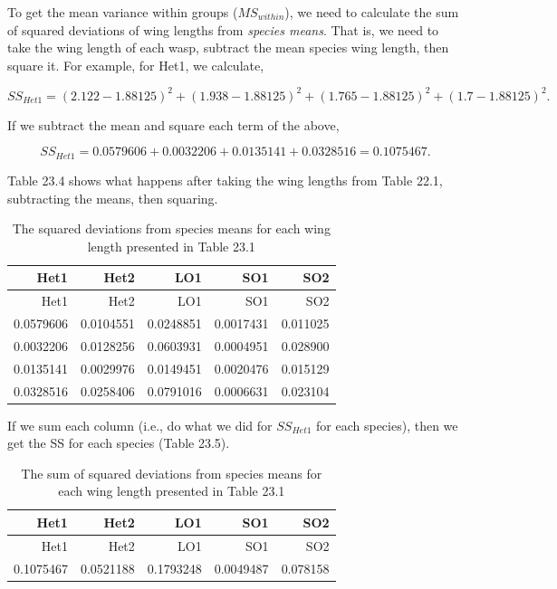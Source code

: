 \documentclass[
]{scrbook}
\begin{document}
To get the mean variance within groups (\(MS_{within}\)), we need to calculate the sum of squared deviations of wing lengths from \emph{species means}.
That is, we need to take the wing length of each wasp, subtract the mean species wing length, then square it.
For example, for Het1, we calculate,

\[SS_{Het1} = (2.122 - 1.88125)^{2} + 
              (1.938 - 1.88125)^{2} +
              (1.765 - 1.88125)^{2} +
              (1.7 - 1.88125)^{2}.\]

If we subtract the mean and square each term of the above,

\[SS_{Het1} = 0.0579606 + 
              0.0032206 +
              0.0135141 +
              0.0328516 = 0.1075467.\]

Table 23.4 shows what happens after taking the wing lengths from Table 22.1, subtracting the means, then squaring.

\begin{longtable}[]{@{}rrrrr@{}}
\caption{\label{tab:unnamed-chunk-110}The squared deviations from species means for each wing length presented in Table 23.1}\tabularnewline
\toprule
Het1 & Het2 & LO1 & SO1 & SO2 \\
\midrule
\endfirsthead
\toprule
Het1 & Het2 & LO1 & SO1 & SO2 \\
\midrule
\endhead
0.0579606 & 0.0104551 & 0.0248851 & 0.0017431 & 0.011025 \\
0.0032206 & 0.0128256 & 0.0603931 & 0.0004951 & 0.028900 \\
0.0135141 & 0.0029976 & 0.0149451 & 0.0020476 & 0.015129 \\
0.0328516 & 0.0258406 & 0.0791016 & 0.0006631 & 0.023104 \\
\bottomrule
\end{longtable}

If we sum each column (i.e., do what we did for \(SS_{Het1}\) for each species), then we get the SS for each species (Table 23.5).

\begin{longtable}[]{@{}rrrrr@{}}
\caption{\label{tab:unnamed-chunk-111}The sum of squared deviations from species means for each wing length presented in Table 23.1}\tabularnewline
\toprule
Het1 & Het2 & LO1 & SO1 & SO2 \\
\midrule
\endfirsthead
\toprule
Het1 & Het2 & LO1 & SO1 & SO2 \\
\midrule
\endhead
0.1075467 & 0.0521188 & 0.1793248 & 0.0049487 & 0.078158 \\
\bottomrule
\end{longtable}
\end{document}
